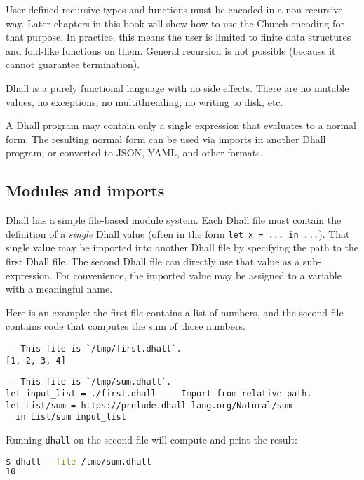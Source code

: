 User-defined recursive types and functions must be encoded in a non-recursive way.
Later chapters in this book will show how to use the Church encoding for that purpose.
In practice, this means the user is limited to finite data structures and fold-like functions on them.
General recursion is not possible (because it cannot guarantee termination).


Dhall is a purely functional language with no side effects.
There are no mutable values, no exceptions, no multithreading, no writing to disk, etc.


A Dhall program may contain only a single expression that evaluates to a normal form.
The resulting normal form can be used via imports in another Dhall program, or converted to JSON, YAML, and other formats.


\subsection{Modules and imports}


Dhall has a simple file-based module system.
Each Dhall file must contain the definition of a \emph{single} Dhall value (often in the form \lstinline!let x = ... in ...!).
That single value may be imported into another Dhall file by specifying the path to the first Dhall file.
The second Dhall file can directly use that value as a sub-expression.
For convenience, the imported value may be assigned to a variable with a meaningful name.


Here is an example: the first file contains a list of numbers, and the second file contains code that computes the sum of those numbers.


\begin{lstlisting}[language=Dhall]
-- This file is `/tmp/first.dhall`.
[1, 2, 3, 4]
\end{lstlisting}


\begin{lstlisting}[language=Dhall]
-- This file is `/tmp/sum.dhall`.
let input_list = ./first.dhall  -- Import from relative path.
let List/sum = https://prelude.dhall-lang.org/Natural/sum
  in List/sum input_list
\end{lstlisting}


Running \lstinline!dhall! on the second file will compute and print the result:


\begin{lstlisting}[language=Bash]
$ dhall --file /tmp/sum.dhall
10
\end{lstlisting}


